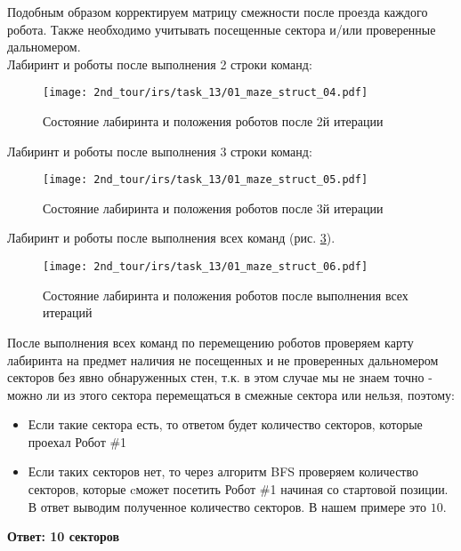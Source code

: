 Подобным образом корректируем матрицу смежности после проезда каждого робота. Также необходимо учитывать посещенные сектора и/или проверенные дальномером.\\

Лабиринт и роботы после выполнения 2 строки команд:
\begin{figure}[h!]
	\centering
	\texttt{[image: 2nd\_tour/irs/task\_13/01\_maze\_struct\_04.pdf]}
	\caption{Состояние лабиринта и положения роботов после 2й итерации}
	\label{fig:01_maze_struct_04}
\end{figure}

Лабиринт и роботы после выполнения 3 строки команд:
\begin{figure}[h!]
	\centering
	\texttt{[image: 2nd\_tour/irs/task\_13/01\_maze\_struct\_05.pdf]}
	\caption{Состояние лабиринта и положения роботов после 3й итерации}
	\label{fig:01_maze_struct_05}
\end{figure}

Лабиринт и роботы после выполнения всех команд (рис. \ref{fig:01_maze_struct_06}).
\begin{figure}[h!]
	\centering
	\texttt{[image: 2nd\_tour/irs/task\_13/01\_maze\_struct\_06.pdf]}
	\caption{Состояние лабиринта и положения роботов после выполнения всех итераций}
	\label{fig:01_maze_struct_06}
\end{figure}

После выполнения всех команд по перемещению роботов проверяем карту лабиринта на предмет наличия не посещенных и не проверенных дальномером секторов без явно обнаруженных стен, т.к. в этом случае мы не знаем точно - можно ли из этого сектора перемещаться в смежные сектора или нельзя, поэтому:
\begin{itemize}
	\item  Если такие сектора есть, то ответом будет количество секторов, которые проехал Робот \#1
	\item Если таких секторов нет, то через алгоритм BFS проверяем количество секторов, которые cможет посетить Робот \#1 начиная со стартовой позиции. \\
	В ответ выводим полученное количество секторов. В нашем примере это $10$.
\end{itemize}


\textbf{Ответ: 10 секторов}


\codeExample


